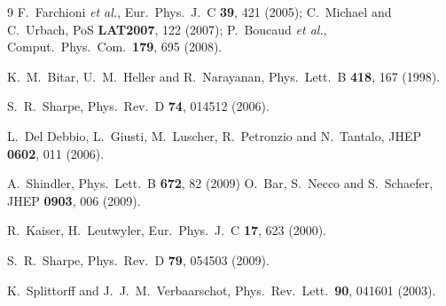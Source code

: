 \documentclass[aps,prl,twocolumn,superscriptaddress,preprintnumbers,floatfix,nofootinbib]{revtex4}
\begin{document}
\begin{thebibliography}{9}
  F.~Farchioni {\it et al.},
  Eur.\ Phys.\ J.\  C {\bf 39}, 421 (2005);
  C.~Michael and C.~Urbach,
  PoS {\bf LAT2007}, 122 (2007);
  P.~Boucaud {\it et al.},
  Comput.\ Phys.\ Com.\  {\bf 179}, 695 (2008).


  K.~M.~Bitar, U.~M.~Heller and R.~Narayanan,
  Phys.\ Lett.\  B {\bf 418}, 167 (1998).


  S.~R.~Sharpe,
  Phys.\ Rev.\  D {\bf 74}, 014512 (2006).


  L.~Del Debbio, L.~Giusti, M.~Luscher, R.~Petronzio and N.~Tantalo,
  JHEP {\bf 0602}, 011 (2006).


 A.~Shindler,
  Phys.\ Lett.\  B {\bf 672}, 82 (2009)
O.~Bar, S.~Necco and S.~Schaefer,
  JHEP {\bf 0903}, 006 (2009).

  R.~Kaiser, H.~Leutwyler,
  Eur.\ Phys.\ J.\  C {\bf 17}, 623 (2000).

  S.~R.~Sharpe,
  Phys.\ Rev.\  D {\bf 79}, 054503 (2009).


K.~Splittorff and J.~J.~M.~Verbaarschot,
  Phys.\ Rev.\ Lett.\  {\bf 90}, 041601 (2003).



\end{thebibliography}
\end{document}
